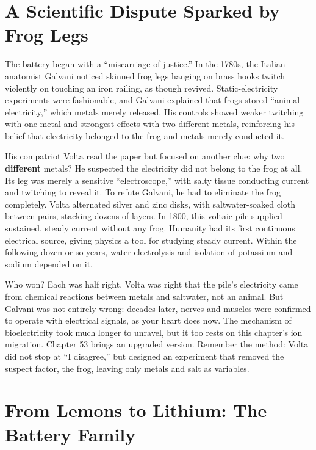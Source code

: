 \section{A Scientific Dispute Sparked by Frog Legs}

\begin{zhengju}
The battery began with a ``miscarriage of justice.'' In the 1780s, the Italian anatomist Galvani noticed skinned frog legs hanging on brass hooks twitch violently on touching an iron railing, as though revived. Static-electricity experiments were fashionable, and Galvani explained that frogs stored ``animal electricity,'' which metals merely released. His controls showed weaker twitching with one metal and strongest effects with two different metals, reinforcing his belief that electricity belonged to the frog and metals merely conducted it.

His compatriot Volta read the paper but focused on another clue: why two \textbf{different} metals? He suspected the electricity did not belong to the frog at all. Its leg was merely a sensitive ``electroscope,'' with salty tissue conducting current and twitching to reveal it. To refute Galvani, he had to eliminate the frog completely. Volta alternated silver and zinc disks, with saltwater-soaked cloth between pairs, stacking dozens of layers. In 1800, this voltaic pile supplied sustained, steady current without any frog. Humanity had its first continuous electrical source, giving physics a tool for studying steady current. Within the following dozen or so years, water electrolysis and isolation of potassium and sodium depended on it.

Who won? Each was half right. Volta was right that the pile's electricity came from chemical reactions between metals and saltwater, not an animal. But Galvani was not entirely wrong: decades later, nerves and muscles were confirmed to operate with electrical signals, as your heart does now. The mechanism of bioelectricity took much longer to unravel, but it too rests on this chapter's ion migration. Chapter 53 brings an upgraded version. Remember the method: Volta did not stop at ``I disagree,'' but designed an experiment that removed the suspect factor, the frog, leaving only metals and salt as variables.
\end{zhengju}

\section{From Lemons to Lithium: The Battery Family}

